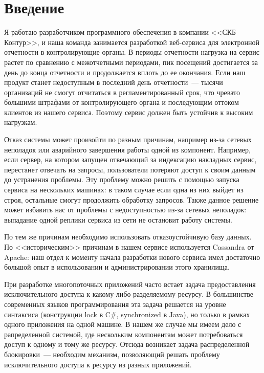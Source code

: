 \section{Введение}

Я работаю разработчиком программного обеспечения в компании <<СКБ Контур>>, и наша команда занимается разработкой веб-сервиса для электронной отчетности в контролирующие органы. В периоды отчетности нагрузка на сервис растет по сравнению с межотчетными периодами, пик посещений достигается за день до конца отчетности и продолжается вплоть до ее окончания. Если наш продукт станет недоступным в последний день отчетности~--- тысячи организаций не смогут отчитаться в регламентированный срок, что чревато большими штрафами от контролирующего органа и последующим оттоком клиентов из нашего сервиса. Поэтому сервис должен быть устойчив к высоким нагрузкам.

Отказ системы может произойти по разным причинам, например из-за сетевых неполадок или аварийного завершения работы одной из компонент. Например, если сервер, на котором запущен отвечающий за индексацию накладных сервис, перестанет отвечать на запросы, пользователи потеряют доступ к своим данным до устранения проблемы. Эту проблему можно решить с помощью запуска сервиса на нескольких машинах: в таком случае если одна из них выйдет из строя, остальные смогут продолжить обработку запросов. Также данное решение может избавить нас от проблемы с недоступностью из-за сетевых неполадок: выпадание одной реплики сервиса из сети не остановит работу системы.

По тем же причинам необходимо использовать отказоустойчивую базу данных. По <<историческим>> причинам в нашем сервисе используется Cassandra от Apache: наш отдел к моменту начала разработки нового сервиса имел достаточно большой опыт в использовании и администрировании этого хранилища.

При разработке многопоточных приложений часто встает задача предоставления исключительного доступа к какому-либо разделяемому ресурсу. В большинстве современных языков программирования эта задача решается на уровне синтаксиса (конструкции lock в C\#, synchronized в Java), но только в рамках одного приложения на одной машине. В нашем же случае мы имеем дело с рапределенной системой, где нескольким компонентам может потребоваться доступ к одному и тому же ресурсу. Отсюда возникает задача распределенной блокировки~--- необходим механизм, позволяющий решать проблему исключительного доступа к ресурсу из разных приложений.

